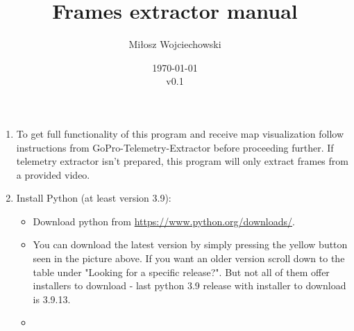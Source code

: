 \documentclass[a4paper,12pt]{article}
\begin{document}
	
\author{Miłosz Wojciechowski}
\title{Frames extractor manual}
\date{\today\\ v0.1}


\maketitle
\pagebreak
{}
\renewcommand{\labelenumii}{\arabic{enumi}.\arabic{enumii}}

\begin{enumerate}
	\item To get full functionality of this program and receive map visualization follow instructions from GoPro-Telemetry-Extractor before proceeding further. If telemetry extractor isn't prepared, this program will only extract frames from a provided video.
	\item Install Python (at least version 3.9):
	\begin{itemize}
		\item Download python  from \url{https://www.python.org/downloads/}. 
		\item \begin{minipage}[t]{\linewidth}
			\raggedright
			\medskip	
		\end{minipage}
		You can download the latest version by simply pressing the yellow button seen in the picture above. If you want an older version scroll down to the table under "Looking for a specific release?". But not all of them offer installers to download - last python 3.9 release with installer to download is 3.9.13. 
		\item \begin{minipage}[t]{\linewidth}
			\raggedright
\end{minipage}
\end{itemize}
\end{enumerate}
\end{document}
